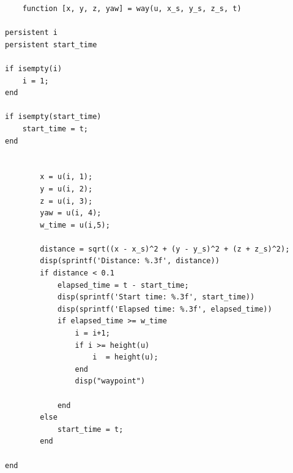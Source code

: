 \documentclass[polish,11pt,a4paper]{article}
\begin{document}
\begin{verbatim}
    function [x, y, z, yaw] = way(u, x_s, y_s, z_s, t)

persistent i
persistent start_time

if isempty(i)
    i = 1;
end

if isempty(start_time)
    start_time = t;
end

       
        x = u(i, 1);
        y = u(i, 2);
        z = u(i, 3);
        yaw = u(i, 4);
        w_time = u(i,5);

        distance = sqrt((x - x_s)^2 + (y - y_s)^2 + (z + z_s)^2);
        disp(sprintf('Distance: %.3f', distance))
        if distance < 0.1
            elapsed_time = t - start_time;
            disp(sprintf('Start time: %.3f', start_time))
            disp(sprintf('Elapsed time: %.3f', elapsed_time))
            if elapsed_time >= w_time
                i = i+1;
                if i >= height(u)
                    i  = height(u);
                end
                disp("waypoint")

            end
        else
            start_time = t;
        end
   
end
\end{verbatim}
\end{document}
